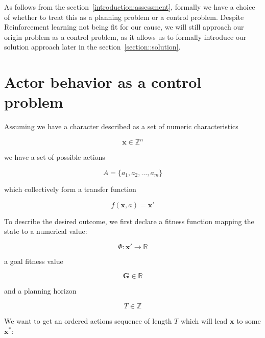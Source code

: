 \documentclass[12pt, a4paper]{report}
\begin{document}
	As follows from the section~\ref{introduction:assessment}, formally we have a choice of whether to treat this as a planning problem or a control problem.
	Despite Reinforcement learning not being fit for our cause, we will still approach our origin problem as a control problem, as it allows us to formally introduce our solution approach later in the section~\ref{section::solution}.

	\section{Actor behavior as a control problem}

	Assuming we have a character described as a set of numeric characteristics
	
	\begin{equation}\label{definitions:attributes-amount}
		\mathbf{x} \in \mathbb{Z}^n
	\end{equation}
	
	we have a set of possible actions
	
	\begin{equation}\label{definitions:actions-amount}
		A = \{a_1, a_2,\ldots, a_m\}
	\end{equation}
	
	which collectively form a transfer function
	
	\begin{equation}\label{definitions:transfer-function}
		f(\mathbf{x}, a) = \mathbf{x}'
	\end{equation}

	To describe the desired outcome, we first declare a fitness function mapping the state to a numerical value:
	
	\begin{equation}
		\Phi : \mathbf{x}' \rightarrow \mathbb{R}
	\end{equation} 
	
	a goal fitness value 
	
	\begin{equation}
		\mathbf{G} \in \mathbb{R}
	\end{equation}
	
	and a planning horizon
	
	\begin{equation}
		T \in \mathbb{Z}
	\end{equation}
	
	We want to get an ordered actions sequence of length $T$ which will lead $\mathbf{x}$ to some $\mathbf{x}^*$:
	
\end{document}

